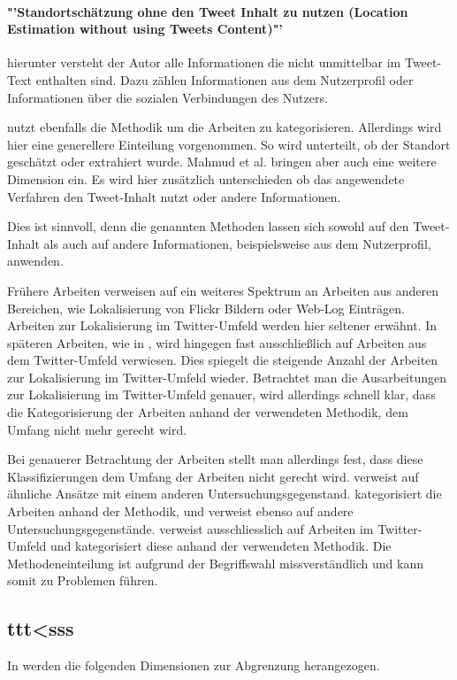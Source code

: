 		\paragraph*{"'Standortschätzung ohne den Tweet Inhalt zu nutzen (Location Estimation without using Tweets Content)"'} hierunter versteht der Autor alle Informationen die nicht unmittelbar im Tweet-Text enthalten sind. Dazu zählen Informationen aus dem Nutzerprofil oder Informationen über die sozialen Verbindungen des Nutzers.


		\cite{Mahmud2012} nutzt ebenfalls die Methodik um die Arbeiten zu kategorisieren. 
		Allerdings wird hier eine generellere Einteilung vorgenommen. 
		So wird unterteilt, ob der Standort geschätzt oder extrahiert wurde.  
		Mahmud et al. bringen aber auch eine weitere Dimension ein. 
		Es wird hier zusätzlich unterschieden ob das angewendete Verfahren den Tweet-Inhalt nutzt oder andere Informationen. 

		Dies ist sinnvoll, denn die genannten Methoden lassen sich sowohl auf den Tweet-Inhalt als auch auf andere Informationen, beispielsweise aus dem Nutzerprofil, anwenden. 
		
		Frühere Arbeiten verweisen auf ein weiteres Spektrum an Arbeiten aus anderen Bereichen, wie Lokalisierung von Flickr Bildern oder Web-Log Einträgen.
		Arbeiten zur Lokalisierung im Twitter-Umfeld werden hier seltener erwähnt. 
		In späteren Arbeiten, wie in \cite{Priedhorsky2013}, wird hingegen fast ausschließlich auf Arbeiten aus dem Twitter-Umfeld verwiesen. 
		Dies spiegelt die steigende Anzahl der Arbeiten zur Lokalisierung im Twitter-Umfeld wieder.
		Betrachtet man die Ausarbeitungen zur Lokalisierung im Twitter-Umfeld genauer, wird allerdings schnell klar, dass die Kategorisierung der Arbeiten anhand der verwendeten Methodik, dem Umfang nicht mehr gerecht wird. 
		
		Bei genauerer Betrachtung der Arbeiten stellt man allerdings fest, dass diese Klassifizierungen dem Umfang der Arbeiten nicht gerecht wird. 
		\cite{Hecht2011} verweist auf ähnliche Ansätze mit einem anderen Untersuchungsgegenstand.
		\cite{Cheng2010} kategorisiert die Arbeiten anhand der Methodik, und verweist ebenso auf andere Untersuchungsgegenstände. 
		\cite{Priedhorsky2013} verweist ausschliesslich auf Arbeiten im Twitter-Umfeld und kategorisiert diese anhand der verwendeten Methodik. 
		Die Methodeneinteilung ist aufgrund der Begriffswahl missverständlich und kann somit zu Problemen führen. 

		\subsection{ttt<sss}
		In \cite{Schulz2013} werden die folgenden Dimensionen zur Abgrenzung herangezogen.

